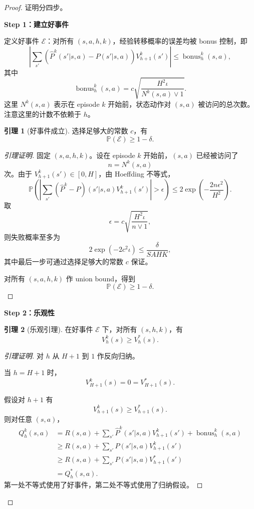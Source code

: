 \documentclass[11pt,a4paper]{article}
\theoremstyle{definition}
\newtheorem{lemma}{引理}[section]
\begin{document}
\begin{proof}
证明分四步。

\textbf{Step 1：建立好事件}

定义好事件 $\mathcal{E}$：对所有 $(s,a,h,k)$，经验转移概率的误差均被 bonus 控制，即
\[
\left|
\sum_{s'}
\left(
\hat P^k(s'|s,a)-P(s'|s,a)
\right)
V_{h+1}^k(s')
\right|
\leq
\operatorname{bonus}_h^k(s,a),
\]
其中
\[
\operatorname{bonus}_h^k(s,a)
=
c\sqrt{
\frac{H^2\iota}{N^k(s,a)\vee 1}
}.
\]
这里 \(N^k(s,a)\) 表示在 episode \(k\) 开始前，状态动作对 \((s,a)\) 被访问的总次数。注意这里的计数不依赖于 \(h\)。

\begin{lemma}[好事件成立]
选择足够大的常数 $c$，有
\[
\mathbb{P}(\mathcal{E})\geq 1-\delta.
\]
\end{lemma}

\begin{proof}[引理证明]
固定 $(s,a,h,k)$。设在 episode \(k\) 开始前，\((s,a)\) 已经被访问了
\[
n=N^k(s,a)
\]
次。由于 \(V_{h+1}^k(s')\in[0,H]\)，由 Hoeffding 不等式，
\[
\mathbb{P}
\left(
\left|
\sum_{s'}
(\hat P^k-P)(s'|s,a)
V_{h+1}^k(s')
\right|
>
\epsilon
\right)
\leq
2\exp\left(
-\frac{2n\epsilon^2}{H^2}
\right).
\]
取
\[
\epsilon
=
c\sqrt{\frac{H^2\iota}{n\vee 1}},
\]
则失败概率至多为
\[
2\exp(-2c^2\iota)
\leq
\frac{\delta}{SAHK},
\]
其中最后一步可通过选择足够大的常数 \(c\) 保证。

对所有 $(s,a,h,k)$ 作 union bound，得到
\[
\mathbb{P}(\mathcal{E})\geq 1-\delta.
\]
\end{proof}

\textbf{Step 2：乐观性}

\begin{lemma}[乐观引理]
在好事件 $\mathcal{E}$ 下，对所有 $(s,h,k)$，有
\[
V_h^k(s)\geq V_h^*(s).
\]
\end{lemma}

\begin{proof}[引理证明]
对 $h$ 从 $H+1$ 到 $1$ 作反向归纳。

当 \(h=H+1\) 时，
\[
V_{H+1}^k(s)=0=V_{H+1}^*(s).
\]

假设对 \(h+1\) 有
\[
V_{h+1}^k(s)\geq V_{h+1}^*(s).
\]
则对任意 $(s,a)$，
\begin{align*}
Q_h^k(s,a)
&=
R(s,a)
+
\sum_{s'}\hat P^k(s'|s,a)V_{h+1}^k(s')
+
\operatorname{bonus}_h^k(s,a)
\\
&\geq
R(s,a)
+
\sum_{s'}P(s'|s,a)V_{h+1}^k(s')
\\
&\geq
R(s,a)
+
\sum_{s'}P(s'|s,a)V_{h+1}^*(s')
\\
&=
Q_h^*(s,a).
\end{align*}
第一处不等式使用了好事件，第二处不等式使用了归纳假设。


\end{proof}
\end{proof}
\end{document}
